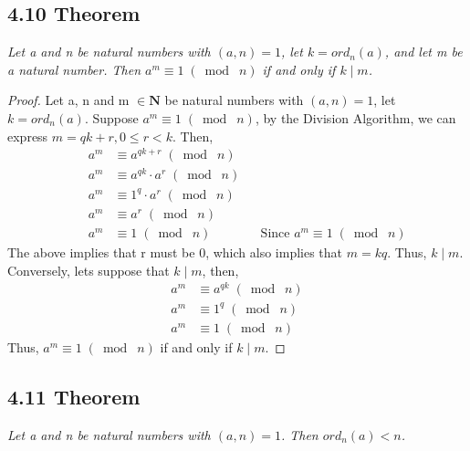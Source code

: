 \documentclass{article}
\begin{document}
\subsection*{4.10 Theorem} 
\quad \textit{Let a and n be natural numbers with $(a, n) = 1$, let $k = ord_n(a)$, and let m be a natural number. Then $a^m \equiv 1 \;(\bmod\; n)$ if and only if $k \mid m$.}

\begin{proof}
Let a, n and m $\in \mathbf{N}$ be natural numbers with $(a, n) = 1$, let $k = ord_n(a)$. Suppose $a^m \equiv 1 \;(\bmod\; n)$, by the Division Algorithm, we can express $m = qk + r, 0 \leq r < k$. Then, 
\begin{align*}
    && a^m &\equiv a^{qk+r} \;(\bmod\; n)&&\\
    && a^m &\equiv a^{qk} \cdot a^r \;(\bmod\; n)&&\\
    && a^m &\equiv 1^q \cdot a^r \;(\bmod\; n)&&\\
    && a^m &\equiv a^r \;(\bmod\; n)&&\\
    && a^m &\equiv 1 \;(\bmod\; n)&& \text{Since $a^m \equiv 1 \;(\bmod\; n)$}
\end{align*}
The above implies that r must be 0, which also implies that $m = kq$. Thus, $k \mid m$.
Conversely, lets suppose that $k \mid m$, then,
\begin{align*}
    && a^m &\equiv a^{qk} \;(\bmod\; n)&&\\
    && a^m &\equiv 1^q \;(\bmod\; n)&&\\
    && a^m &\equiv 1 \;(\bmod\; n)&&
\end{align*}
Thus, $a^m \equiv 1 \;(\bmod\; n)$ if and only if $k \mid m$.
\end{proof}

\subsection*{4.11 Theorem} 
\quad \textit{Let a and n be natural numbers with $(a, n) = 1$. Then $ord_n(a) < n$.}
\end{document}
